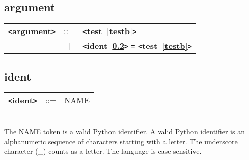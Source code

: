 \documentclass[12pt]{article}
\begin{document}
\subsection{argument}
\label{argumentb}
\begin{tabular}{lcl}
{\bf \verb+<+argument\verb+>+} & ::=  & {\bf \verb+<+test~\ref{testb}\verb+>+}  \\
 & \verb+|+  & {\bf \verb+<+ident~\ref{identb}\verb+>+}  \verb|=| {\bf \verb+<+test~\ref{testb}\verb+>+}  \\
\end{tabular}

\subsection{ident}
\label{identb}
\begin{tabular}{lcl}
{\bf \verb+<+ident\verb+>+} & ::=  & NAME \\
\end{tabular} \\

The NAME token is a valid Python identifier.  A valid Python identifier is an alphanumeric sequence of characters starting with a letter.  The underscore character (\_) counts as a letter.  The language is case-sensitive.
\end{document}
